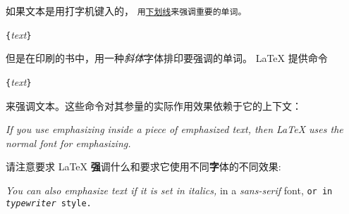 如果文本是用打字机键入的，
\texttt{用\underline{下划线}来强调重要的单词。}
\begin{lscommand}
\verb|{|\emph{text}\verb|}|
\end{lscommand}
但是在印刷的书中，用一种\emph{斜体}字体排印要强调的单词。
\LaTeX{} 提供命令
\begin{lscommand}
\verb|{|\emph{text}\verb|}|
\end{lscommand}
\noindent
来强调文本。这些命令对其参量的实际作用效果依赖于它的上下文：

\begin{example}
\emph{If you use
  emphasizing inside a piece
  of emphasized text, then
  \LaTeX{} uses the
  \emph{normal} font for
  emphasizing.}
\end{example}

请注意要求 \LaTeX{} {\textbf 强调}什么和要求它使用不同{\textbf
字体}的不同效果:

\begin{example}
\textit{You can also
  \emph{emphasize} text if
  it is set in italics,}
\textsf{in a
  \emph{sans-serif} font,}
\texttt{or in
  \emph{typewriter} style.}
\end{example}

